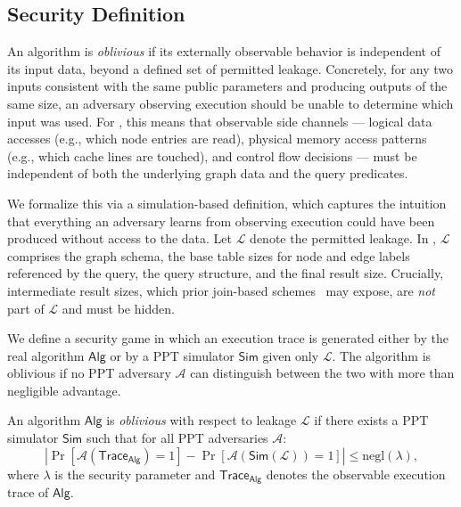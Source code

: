 \subsection{Security Definition}
\label{sub:sec-definition}

An algorithm is \emph{oblivious} if its externally observable behavior is 
independent of its input data, beyond a defined set of permitted leakage. 
Concretely, for any two inputs consistent with the same public parameters and 
producing outputs of the same size, an adversary observing execution should be 
unable to determine which input was used. For \system, this means that 
observable side channels --- logical data accesses (e.g., which node entries 
are read), physical memory access patterns (e.g., which cache lines are 
touched), and control flow decisions --- must be independent of both the 
underlying graph data and the query predicates.

We formalize this via a simulation-based definition, which captures the 
intuition that everything an adversary learns from observing execution could 
have been produced without access to the data. Let $\mathcal{L}$ denote the 
permitted leakage. In \system, $\mathcal{L}$ comprises the graph schema, the 
base table sizes for node and edge labels referenced by the query, the query 
structure, and the final result size. Crucially, intermediate result sizes,
which prior join-based schemes~\cite{ruidi2025oblivious, 
mavrogiannakis2025obliviator} may expose, are \emph{not} part of 
$\mathcal{L}$ and must be hidden.

We define a security game in which an execution trace is generated either by 
the real algorithm $\mathsf{Alg}$ or by a PPT simulator $\mathsf{Sim}$ given 
only $\mathcal{L}$. The algorithm is oblivious if no PPT adversary 
$\mathcal{A}$ can distinguish between the two with more than negligible 
advantage.

\begin{definition}
\label{def:oblivious}
An algorithm $\mathsf{Alg}$ is \emph{oblivious} with respect to leakage 
$\mathcal{L}$ if there exists a PPT simulator $\mathsf{Sim}$ such that for 
all PPT adversaries $\mathcal{A}$:
\[
\left| 
\Pr\left[\mathcal{A}(\mathsf{Trace}_{\mathsf{Alg}}) = 1\right] 
- 
\Pr\left[\mathcal{A}(\mathsf{Sim}(\mathcal{L})) = 1\right] 
\right| \leq \mathrm{negl}(\lambda),
\]
where $\lambda$ is the security parameter and $\mathsf{Trace}_{\mathsf{Alg}}$ 
denotes the observable execution trace of $\mathsf{Alg}$.
\end{definition}

